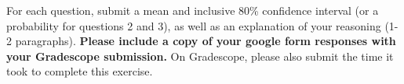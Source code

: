 \documentclass[11pt]{article}
\begin{document}
For each question, submit a mean and inclusive 80\% confidence interval (or a probability for questions 2 and 3), as well as an explanation of your reasoning (1-2 paragraphs). \textbf{Please include a copy of your google form responses with your Gradescope submission.} On Gradescope, please also submit the time it took to complete this exercise.
\end{document}
